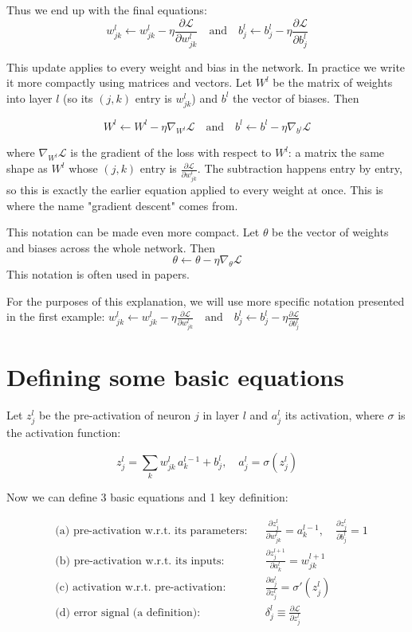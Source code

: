 \documentclass{article}
\begin{document}
Thus we end up with the final equations:
\[w^{l}_{jk} \leftarrow w^{l}_{jk} - \eta \frac{\partial \mathcal{L}}{\partial w^{l}_{jk}} \quad \text{and} \quad b^l_j \leftarrow b^l_j - \eta \frac{\partial \mathcal{L}}{\partial b^{l}_{j}}\]

This update applies to every weight and bias in the network. In practice we write it more compactly using matrices and vectors. Let $W^l$ be the matrix of weights into layer $l$ (so its $(j,k)$ entry is $w^l_{jk}$) and $b^l$ the vector of biases. Then

\[W^l \leftarrow W^l - \eta \nabla_{W^l}\mathcal{L} \quad \text{and} \quad b^l \leftarrow b^l - \eta \nabla_{b^l}\mathcal{L}\]

where $\nabla_{W^l}\mathcal{L}$ is the gradient of the loss with respect to $W^l$: a matrix the same shape as $W^l$ whose $(j,k)$ entry is $\frac{\partial \mathcal{L}}{\partial w^l_{jk}}$. The subtraction happens entry by entry, so this is exactly the earlier equation applied to every weight at once. This is where the name "gradient descent" comes from.

This notation can be made even more compact. Let $\theta$ be the vector of weights and biases across the whole network. Then
\[\theta \leftarrow \theta - \eta \nabla_\theta \mathcal{L}\]
This notation is often used in papers.


For the purposes of this explanation, we will use more specific notation presented in the first example: $w^l_{jk} \leftarrow w^l_{jk} - \eta \frac{\partial \mathcal{L}}{\partial w^l_{jk}} \quad \text{and} \quad b^l_j \leftarrow b^l_j - \eta \frac{\partial \mathcal{L}}{\partial b^l_j}$

\section*{Defining some basic equations}
Let $z^l_j$ be the pre-activation of neuron $j$ in layer $l$ and $a^l_j$ its activation, where $\sigma$ is the activation function:

\[z^l_j = \sum_k w^l_{jk}\,a^{l-1}_k + b^l_j, \quad a^l_j = \sigma(z^l_j)\]

Now we can define 3 basic equations and 1 key definition:

\[
\begin{aligned}
&\text{(a) pre-activation w.r.t. its parameters:} && \frac{\partial z^l_j}{\partial w^l_{jk}} = a^{l-1}_k, \quad \frac{\partial z^l_j}{\partial b^l_j} = 1 \\[8pt]
&\text{(b) pre-activation w.r.t. its inputs:} && \frac{\partial z^{l+1}_j}{\partial a^l_k} = w^{l+1}_{jk} \\[8pt]
&\text{(c) activation w.r.t. pre-activation:} && \frac{\partial a^l_j}{\partial z^l_j} = \sigma'(z^l_j) \\[8pt]
&\text{(d) error signal (a definition):} && \delta^l_j \equiv \frac{\partial \mathcal{L}}{\partial z^l_j}
\end{aligned}
\]
\end{document}
